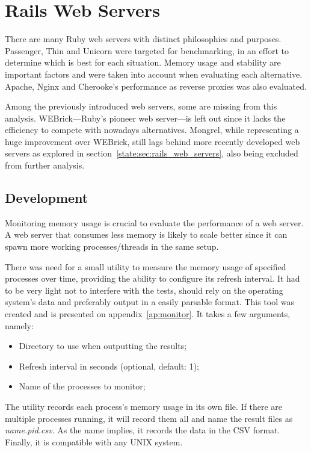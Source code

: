 \section{Rails Web Servers} %
\label{solution:sec:rails_web_servers}

There are many Ruby web servers with distinct philosophies and purposes. Passenger, Thin and Unicorn were targeted for benchmarking, in an effort to determine which is best for each situation. Memory usage and stability are important factors and were taken into account when evaluating each alternative. Apache, Nginx and Cherooke's performance as reverse proxies was also evaluated.

Among the previously introduced web servers, some are missing from this analysis. WEBrick---Ruby's pioneer web server---is left out since it lacks the efficiency to compete with nowadays alternatives. Mongrel, while representing a huge improvement over WEBrick, still lags behind more recently developed web servers as explored in section~\ref{state:sec:rails_web_servers}, also being excluded from further analysis.

\subsection{Development}
Monitoring memory usage is crucial to evaluate the performance of a web server. A web server that consumes less memory is likely to scale better since it can spawn more working processes/threads in the same setup.

There was need for a small utility to measure the memory usage of specified processes over time, providing the ability to configure its refresh interval. It had to be very light not to interfere with the tests, should rely on the operating system's data and preferably output in a easily parsable format. This tool was created and is presented on appendix~\ref{ap:monitor}. It takes a few arguments, namely:
\begin{itemize}
  \item Directory to use when outputting the results;
  \item Refresh interval in seconds (optional, default: 1);
  \item Name of the processes to monitor;
\end{itemize}
The utility records each process's memory usage in its own file. If there are multiple processes running, it will record them all and name the result files as \textit{name.pid.csv}. As the name implies, it records the data in the CSV format. Finally, it is compatible with any UNIX system.


